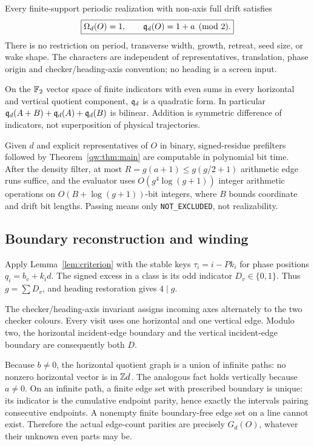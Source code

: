 \begin{theorem}\label{qw:thm:main}
Every finite-support periodic realization with non-axis full drift satisfies
\[
 \boxed{\Omega_d(O)=1,\qquad \mathfrak q_d(O)=1+a\pmod2.}
\]
There is no restriction on period, transverse width, growth, retreat, seed size,
or wake shape. The characters are independent of representatives, translation,
phase origin and checker/heading-axis convention; no heading is a screen input.
\end{theorem}

\begin{theorem}\label{qw:thm:quadratic}
On the $\mathbb F_2$ vector space of finite indicators with even sums in every horizontal
and vertical quotient component, $\mathfrak q_d$ is a quadratic form. In particular
$\mathfrak q_d(A+B)+\mathfrak q_d(A)+\mathfrak q_d(B)$ is bilinear. Addition is symmetric difference of
indicators, not superposition of physical trajectories.
\end{theorem}

\begin{theorem}\label{qw:thm:complexity}
Given $d$ and explicit representatives of $O$ in binary, signed-residue
prefilters followed by Theorem~\ref{qw:thm:main} are computable in polynomial bit
time. After the density filter, at most
$R=g(a+1)\le g(g/2+1)$ arithmetic edge runs suffice, and the evaluator uses
$O(g^4\log(g+1))$ integer arithmetic operations on $O(B+\log(g+1))$-bit integers,
where $B$ bounds coordinate and drift bit lengths. Passing means only
\texttt{NOT\_EXCLUDED}, not realizability.
\end{theorem}

\subsection{Boundary reconstruction and winding}
Apply Lemma~\ref{lem:criterion} with the stable keys $\tau_i=i-Pk_i$
for phase positions $q_i=b_v+k_i d$. The signed excess in a class is its
odd indicator $D_v\in\{0,1\}$. Thus $g=\sum D_v$, and heading restoration
gives $4\mid g$.

The checker/heading-axis invariant assigns incoming axes alternately to the
two checker colours. Every visit uses one horizontal and one vertical edge.
Modulo two, the horizontal incident-edge boundary and the vertical
incident-edge boundary are consequently both $D$.

Because $b\ne0$, the horizontal quotient graph is a union of infinite paths:
no nonzero horizontal vector is in $\mathbb Z d$. The analogous fact holds vertically
because $a\ne0$. On an infinite path, a finite edge set with prescribed boundary
is unique: its indicator is the cumulative endpoint parity, hence exactly the
intervals pairing consecutive endpoints. A nonempty finite boundary-free edge
set on a line cannot exist. Therefore the actual edge-count parities are
precisely $G_d(O)$, whatever their unknown even parts may be.

